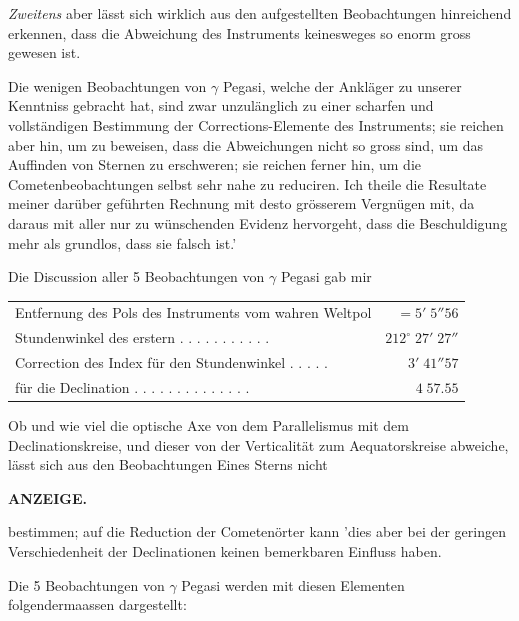 \emph{Zweitens} aber lässt sich wirklich aus den aufgestellten Beobachtungen hinreichend erkennen, dass die Abweichung des Instruments keinesweges so enorm gross gewesen ist.

Die wenigen Beobachtungen von $\gamma$ Pegasi, welche der Ankläger zu unserer Kenntniss gebracht hat, sind zwar unzulänglich zu einer scharfen und vollständigen Bestimmung der Corrections-Elemente des Instruments; sie reichen aber hin, um zu beweisen, dass die Abweichungen nicht so gross sind, um das Auffinden von Sternen zu erschweren; sie reichen ferner hin, um die Cometenbeobachtungen selbst sehr nahe zu reduciren. Ich theile die Resultate meiner darüber geführten Rechnung mit desto grösserem Vergnügen mit, da daraus mit aller nur zu wünschenden Evidenz hervorgeht, dass die Beschuldigung mehr als grundlos, dass sie falsch ist.'

Die Discussion aller 5 Beobachtungen von $\gamma$ Pegasi gab mir
\begin{center}\footnotesize\setlength{\tabcolsep}{3pt}
\begin{tabular}{@{}l r@{}}
Entfernung des Pols des Instruments vom wahren Weltpol & $=5'\;5''56$\\
Stundenwinkel des erstern . . . . . . . . . . . & $212^\circ\;27'\;27''$\\
Correction des Index für den Stundenwinkel . . . . . & $3'\;41''57$\\
für die Declination . . . . . . . . . . . . . . & $4\;57.55$
\end{tabular}\end{center}

Ob und wie viel die optische Axe von dem Parallelismus mit dem Declinationskreise, und dieser von der Verticalität zum Aequatorskreise abweiche, lässt sich aus den Beobachtungen Eines Sterns nicht\par
\clearpage
\thispagestyle{empty}
\noindent{}%
%
\parbox[t]{\dimexpr\linewidth-24mm\relax}{\centering\footnotesize\bfseries ANZEIGE.\par}%
\makebox[12mm][r]{}\par\medskip
\noindent bestimmen; auf die Reduction der Cometenörter kann 'dies aber bei der geringen Verschiedenheit der Declinationen keinen bemerkbaren Einfluss haben.

Die 5 Beobachtungen von $\gamma$ Pegasi werden mit diesen Elementen folgendermaassen
dargestellt:

